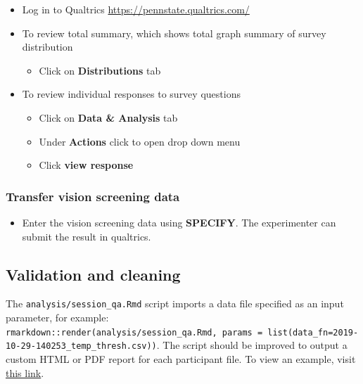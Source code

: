 \documentclass[]{article}
\providecommand{\tightlist}{%
  \setlength{\itemsep}{0pt}\setlength{\parskip}{0pt}}
\begin{document}
\begin{itemize}
\tightlist
\item
  Log in to Qualtrics \url{https://pennstate.qualtrics.com/}
\item
  To review total summary, which shows total graph summary of survey
  distribution

  \begin{itemize}
  \tightlist
  \item
    Click on \textbf{Distributions} tab
  \end{itemize}
\item
  To review individual responses to survey questions

  \begin{itemize}
  \tightlist
  \item
    Click on \textbf{Data \& Analysis} tab
  \item
    Under \textbf{Actions} click to open drop down menu
  \item
    Click \textbf{view response}
  \end{itemize}
\end{itemize}

\subsubsection{Transfer vision screening
data}\label{transfer-vision-screening-data}

\begin{itemize}
\tightlist
\item
  Enter the vision screening data using \textbf{SPECIFY}. The
  experimenter can submit the result in qualtrics.
\end{itemize}

\subsection{Validation and cleaning}\label{validation-and-cleaning}

The \texttt{analysis/session\_qa.Rmd} script imports a data file
specified as an input parameter, for example:
\texttt{rmarkdown::render(\textquotesingle{}analysis/session\_qa.Rmd\textquotesingle{},\ params\ =\ list(data\_fn=\textquotesingle{}2019-10-29-140253\_temp\_thresh.csv\textquotesingle{}))}.
The script should be improved to output a custom HTML or PDF report for
each participant file. To view an example, visit
\href{https://gilmore-lab.github.io/sex-differences-in-motion-perception/analysis/session_qa.html}{this
link}.
\end{document}

